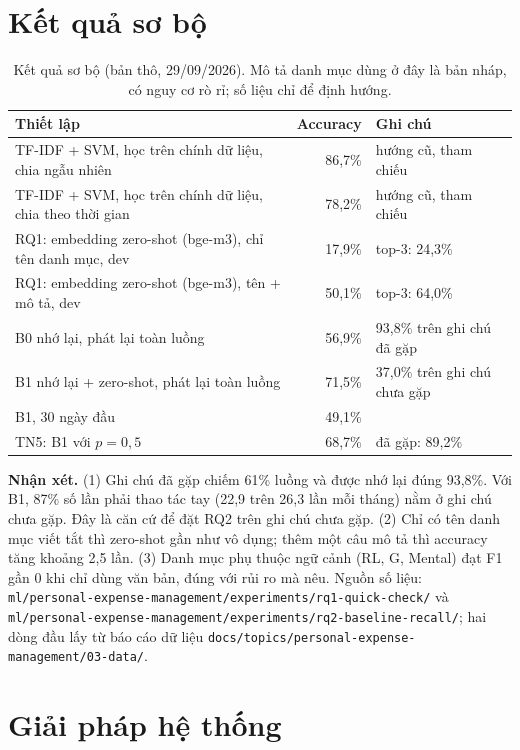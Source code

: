 \documentclass[12pt,a4paper]{article}
\begin{document}
\section{Kết quả sơ bộ}

\begin{table}[H]
\centering\small
\caption{Kết quả sơ bộ (bản thô, 29/09/2026). Mô tả danh mục dùng ở đây là bản nháp, có nguy cơ rò rỉ; số liệu chỉ để định hướng.}
\label{tab:prelim}
\begin{tabularx}{\linewidth}{L r l}
\toprule
Thiết lập & Accuracy & Ghi chú \\
\midrule
TF-IDF + SVM, học trên chính dữ liệu, chia ngẫu nhiên & 86,7\% & hướng cũ, tham chiếu \\
TF-IDF + SVM, học trên chính dữ liệu, chia theo thời gian & 78,2\% & hướng cũ, tham chiếu \\
\midrule
RQ1: embedding zero-shot (bge-m3), chỉ tên danh mục, dev & 17,9\% & top-3: 24,3\% \\
RQ1: embedding zero-shot (bge-m3), tên + mô tả, dev & 50,1\% & top-3: 64,0\% \\
\midrule
B0 nhớ lại, phát lại toàn luồng & 56,9\% & 93,8\% trên ghi chú đã gặp \\
B1 nhớ lại + zero-shot, phát lại toàn luồng & 71,5\% & 37,0\% trên ghi chú chưa gặp \\
B1, 30 ngày đầu & 49,1\% & \\
TN5: B1 với $p=0{,}5$ & 68,7\% & đã gặp: 89,2\% \\
\bottomrule
\end{tabularx}
\end{table}

\textbf{Nhận xét.} (1) Ghi chú đã gặp chiếm 61\% luồng và được nhớ lại đúng 93,8\%. Với B1, 87\% số lần phải thao tác tay (22,9 trên 26,3 lần mỗi tháng) nằm ở ghi chú chưa gặp. Đây là căn cứ để đặt RQ2 trên ghi chú chưa gặp. (2) Chỉ có tên danh mục viết tắt thì zero-shot gần như vô dụng; thêm một câu mô tả thì accuracy tăng khoảng 2,5 lần. (3) Danh mục phụ thuộc ngữ cảnh (RL, G, Mental) đạt F1 gần 0 khi chỉ dùng văn bản, đúng với rủi ro mà \citet{li2023synthetic} nêu. Nguồn số liệu: \texttt{ml/personal-expense-management/experiments/rq1-quick-check/} và \texttt{ml/personal-expense-management/experiments/rq2-baseline-recall/}; hai dòng đầu lấy từ báo cáo dữ liệu \texttt{docs/topics/personal-expense-management/03-data/}.

\section{Giải pháp hệ thống}
\end{document}
